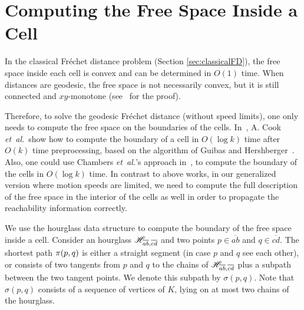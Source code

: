 \documentclass[12pt]{dalthesis}
\newcommand{\etal}{{\em et~al.\/}}
\newcommand{\REM}[1]{}
\newcommand{\Frechet}{Fr\'echet }
\newcommand{\Ov}[1]{\overline{#1}}
\begin{document}
\REM{
If $\SP(a,c)$ and $\SP(b,d)$
are disjoint, the hourglass is called open, otherwise it is called closed. If $\Ov{ab}$ and $\Ov{cd}$ are crossing,
$\Ho{ab}{cd}$ is defined as the region bounded by 
$\SP(a,c)$, $\SP(a,d)$, $\SP(b,c)$ and $\SP(b,d)$.
}




\newcommand{\Sub}{{\sigma}}

\section{Computing the Free Space Inside a Cell} 
\label{sec:ComputingFreeSpace}

In the classical \Frechet distance problem
(Section \ref{sec:classicalFD}),
the free space inside each cell 
is convex and can be determined in $O(1)$ time. 
When distances are geodesic, 
the free space is not necessarily convex,
but it is still connected and $xy$-monotone 
(see~\cite{WenkC08a} for the proof).



Therefore, to solve the geodesic \Frechet distance (without speed limits),
one only needs to compute the free space on the boundaries of the cells.
In~\cite{WenkC08a}, A. Cook \etal ~show how to compute  
the boundary of a cell in $O(\log k)$ time after
$O(k)$ time preprocessing, 
based on the algorithm of Guibas and Hershberger~\cite{Guibas86}.  
Also, one could use Chambers \etal's approach in~\cite{Chambers10}, 
to compute the boundary of the cells in $O(\log k)$ time.
In contrast to above works, in our generalized version where motion speeds are limited,
we need to compute the full description of the free space in the
interior of the cells as well in order to propagate the reachability 
information correctly. 

\REM{
To compute the full description of the free space in the interior of cells,
one could use Chambers \etal's approach in \cite{Chambers10}. 
That leads to $O(n^2k\log k)$ time solution, 
where $n$ is the total complexity of the curves and 
$k$ is the complexity of the polygon. Here, we 
propose an algorithm which 
computes the interior of all cells in $O(n^2k)$ total time. 
}

We use the hourglass data structure to compute the 
boundary of the free space inside a cell.
Consider an hourglass $\Ho{ab}{cd}$ 
and two points $p \in \Ov{ab}$ and $q \in \Ov{cd}$.
The shortest path $\pi(p,q)$ is either a straight segment 
(in case $p$ and $q$ see each other),
or consists of two tangents from $p$ and $q$ to the chains of $\Ho{ab}{cd}$
plus a subpath between the two tangent points.
We denote this subpath by $\Sub(p,q)$.
Note that $\Sub(p,q)$ consists of a sequence of vertices of $K$,
lying on at most two chains of the hourglass.
\end{document}
